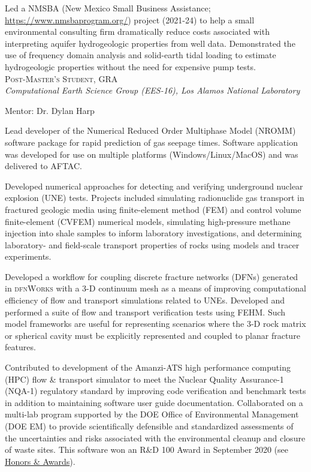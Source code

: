 \documentclass[11pt, letterpaper]{article}
\newcommand{\years}[1]{\marginnote{\scriptsize #1}}
\begin{document}
	Led a NMSBA (New Mexico Small Business Assistance;
	\href{https://www.nmsbaprogram.org/}{https://www.nmsbaprogram.org/})
	project (2021-24) to help a small environmental consulting firm dramatically reduce
	costs associated with interpreting aquifer hydrogeologic properties from
	well data.  Demonstrated the use of frequency domain analysis and
	solid-earth tidal loading to estimate hydrogeologic properties without the
	need for expensive pump tests. \\

\noindent
\years{2017 - 2019}\textsc{Post-Master's Student, GRA}\\
\textit{Computational Earth Science Group (EES-16), Los Alamos National Laboratory}

    \vspace{3pt} \noindent  
    Mentor: Dr. Dylan Harp

	Lead developer of the Numerical Reduced Order Multiphase Model (NROMM)
	software package for rapid prediction of gas seepage times. Software
	application was developed for use on multiple platforms
	(Windows/Linux/MacOS) and was delivered to AFTAC.

	Developed numerical approaches for detecting and verifying underground
	nuclear explosion (UNE) tests. Projects included simulating
	radionuclide gas transport in fractured geologic media using finite-element
	method (FEM) and control volume finite-element (CVFEM) numerical models,
	simulating high-pressure methane injection into shale samples to inform
	laboratory investigations, and determining laboratory- and field-scale
	transport properties of rocks using models and tracer experiments.

    Developed a workflow for coupling discrete fracture networks (DFNs)
    generated in \textsc{dfnWorks} with a 3-D continuum mesh as a means of
    improving computational efficiency of flow and transport simulations
    related to UNEs.  Developed and performed a suite of flow and transport
    verification tests using FEHM. Such model frameworks are useful for
    representing scenarios where the 3-D rock matrix or spherical cavity must
    be explicitly represented and coupled to planar fracture features.

    Contributed to development of the Amanzi-ATS high performance computing
    (HPC) flow \& transport simulator to meet the Nuclear Quality Assurance-1
    (NQA-1) regulatory standard by improving code verification and benchmark
    tests in addition to maintaining software user guide documentation.
    Collaborated on a multi-lab program supported by the DOE Office of
    Environmental Management (DOE EM) to provide scientifically defensible and
    standardized assessments of the uncertainties and risks associated with the
    environmental cleanup and closure of waste sites. This software won an R\&D
    100 Award in September 2020 (see \hyperref[sec:awards]{Honors \&
    Awards}).\\
\end{document}
